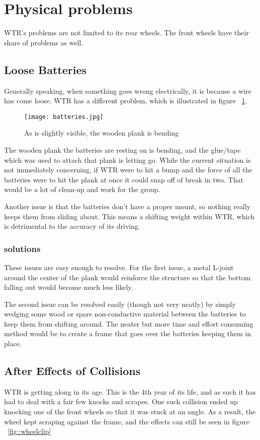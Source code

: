 \section{Physical problems}
WTR's problems are not limited to its rear wheels.
The front wheels have their share of problems as well.

\subsection{Loose Batteries}
Generally speaking, when something goes wrong electrically, it is because a wire has come loose.
WTR has a different problem, which is illustrated in figure ~\ref{fig::batteries}.

\begin{figure}[H]
\texttt{[image: batteries.jpg]}
\caption{As is slightly visible, the wooden plank is bending}
\label{fig::batteries}
\end{figure}

The wooden plank the batteries are resting on is bending, and the glue/tape which was used to attach that plank is letting go.
While the current situation is not immediately concerning, if WTR were to hit a bump and the force of all the batteries were to hit the plank at once it could snap off of break in two.
That would be a lot of clean-up and work for the group.

Another issue is that the batteries don't have a proper mount, so nothing really keeps them from sliding about.
This means a shifting weight within WTR, which is detrimental to the accuracy of its driving.

\subsubsection{solutions}
These issues are easy enough to resolve.
For the first issue, a metal L-joint around the center of the plank would reinforce the structure so that the bottom falling out would become much less likely.

The second issue can be resolved easily (though not very neatly) by simply wedging some wood or spare non-conductive material between the batteries to keep them from shifting around.
The neater but more time and effort consuming method would be to create a frame that goes over the batteries keeping them in place.


\subsection{After Effects of Collisions}
WTR is getting along in its age.
This is the 4th year of its life, and as such it has had to deal with a fair few knocks and scrapes.
One such collision ended up knocking one of the front wheels so that it was stuck at an angle.
As a result, the wheel kept scraping against the frame, and the effects can still be seen in figure ~\ref{fig::wheelclip}

